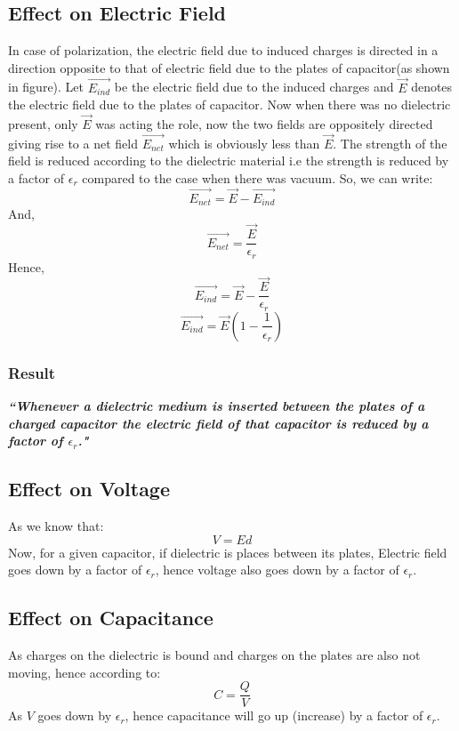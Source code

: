 \subsection*{Effect on Electric Field}
In case of polarization, the electric field due to induced charges is
directed in a direction opposite to that of electric field due to the
plates of capacitor(as shown in figure). Let $\vec{E_{ind}}$ be the electric
field due to the induced charges and $\vec{E}$ denotes the electric
field due to the plates of capacitor. Now when there was no dielectric
present, only $\vec{E}$ was acting the role, now the two fields are
oppositely directed giving rise to a net field $\vec{E_{net}}$ 
which is obviously less than $\vec{E}$.
The strength of the field is reduced according to the dielectric material
i.e the strength is reduced by a factor of $\epsilon_r$ compared to the
case when there was vacuum.
So, we can write:
\begin{equation}\nonumber
  \vec{E_{net}} = \vec{E} - \vec{E_{ind}}
\end{equation}
And,
\begin{equation}\nonumber
  \vec{E_{net}} = \frac{\vec{E}}{\epsilon_{r}}
\end{equation}
Hence,
\begin{equation}\nonumber
  \vec{E_{ind}} = \vec{E} - \frac{\vec{E}}{\epsilon_{r}}
\end{equation}
\begin{equation}\label{eq:11.86}
  \vec{E_{ind}} = \vec{E}(1 - \frac{1}{\epsilon_{r}})
\end{equation}
\subsubsection{Result}
\textit{\textbf{
  ``Whenever a dielectric medium is inserted between the plates of a
  charged capacitor
  the electric field of that capacitor is reduced by a factor of $\epsilon_{r}$."
}}
\subsection*{Effect on Voltage}
As we know that:
\begin{equation}\nonumber
  V = Ed
\end{equation}
Now, for a given capacitor, if dielectric is places between its plates,
Electric field goes down by a factor of $\epsilon_{r}$,
hence voltage also goes down by a factor of $\epsilon_{r}$.
\subsection*{Effect on Capacitance}
As charges on the dielectric is
bound and charges on the plates are also not moving, hence according to:
\begin{equation}
  C = \frac{Q}{V}
\end{equation}
As $V$ goes down by $\epsilon_{r}$,
hence capacitance will go up (increase) by a factor of $\epsilon_{r}$.
\newpage

